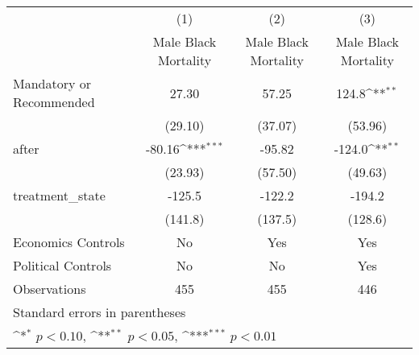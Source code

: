 {
\def\sym#1{\ifmmode^{#1}\else\(^{#1}\)\fi}
\begin{longtable}{l*{3}{c}}
\hline\hline\endfirsthead\hline\endhead\hline\endfoot\endlastfoot
                    &\multicolumn{1}{c}{(1)}&\multicolumn{1}{c}{(2)}&\multicolumn{1}{c}{(3)}\\
                    &\multicolumn{1}{c}{Male Black Mortality}&\multicolumn{1}{c}{Male Black Mortality}&\multicolumn{1}{c}{Male Black Mortality}\\
\hline
Mandatory or Recommended&       27.30         &       57.25         &       124.8\sym{**} \\
                    &     (29.10)         &     (37.07)         &     (53.96)         \\
[1em]
after               &      -80.16\sym{***}&      -95.82         &      -124.0\sym{**} \\
                    &     (23.93)         &     (57.50)         &     (49.63)         \\
[1em]
treatment\_state     &      -125.5         &      -122.2         &      -194.2         \\
                    &     (141.8)         &     (137.5)         &     (128.6)         \\
[1em]
Economics Controls  &          No         &         Yes         &         Yes         \\
[1em]
Political Controls  &          No         &          No         &         Yes         \\
\hline
Observations        &         455         &         455         &         446         \\
\hline\hline
\multicolumn{4}{l}{\footnotesize Standard errors in parentheses}\\
\multicolumn{4}{l}{\footnotesize \sym{*} \(p<0.10\), \sym{**} \(p<0.05\), \sym{***} \(p<0.01\)}\\
\end{longtable}
}
